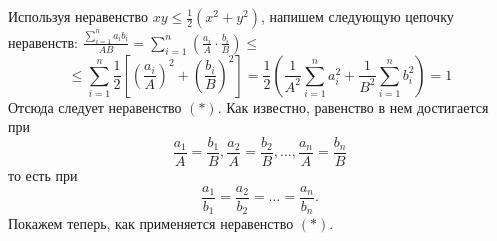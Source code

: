 \vspace{50pt}

\par Используя неравенство $x y \le \frac{1}{2}(x^2 + y^2)$, напишем следующую цепочку неравенств: $\frac{\sum\limits_{i = 1}^n a_i b_i}{AB} = \sum\limits_{i = 1}^n \left(\frac{a_i}{A} \cdot \frac{b_i}{B}\right) \le$ 
$$
\le \sum\limits_{i = 1}^n \frac{1}{2}\left[ \left( \frac{a_i}{A}\right)^2 + \left( \frac{b_i}{B}\right)^2\right] = \frac{1}{2} \left( \frac{1}{A^2}\sum\limits_{i = 1}^n a_i^2 + \frac{1}{B^2} \sum\limits_{i = 1}^n b_i^2\right) = 1
$$
Отсюда следует неравенство $(*)$. Как известно, равенство в нем достигается при
$$
\frac{a_1}{A} = \frac{b_1}{B}, \frac{a_2}{A} = \frac{b_2}{B}, \ldots, \frac{a_n}{A} = \frac{b_n}{B}
$$
то есть при
$$
\frac{a_1}{b_1} = \frac{a_2}{b_2} = \ldots = \frac{a_n}{b_n}. 
$$
Покажем теперь, как применяется неравенство $(*)$.
